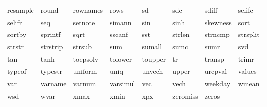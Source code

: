\begin{tabular}{llllllll}
resample & round & rownames & rows & sd & sdc & sdiff & selifc \\
selifr & seq & setnote & simann & sin & sinh & skewness & sort \\
sortby & sprintf & sqrt & sscanf & sst & strlen & strncmp & strsplit \\
strstr & strstrip & strsub & sum & sumall & sumc & sumr & svd \\
tan & tanh & toepsolv & tolower & toupper & tr & transp & trimr \\
typeof & typestr & uniform & uniq & unvech & upper & urcpval & values \\
var & varname & varnum & varsimul & vec & vech & weekday & wmean \\
wsd & wvar & xmax & xmin & xpx & zeromiss & zeros & \\
\end{tabular}

